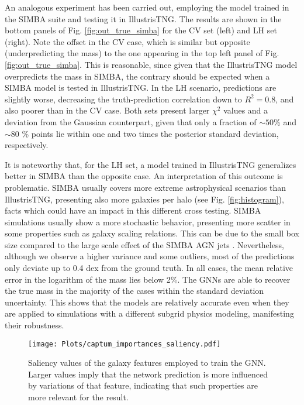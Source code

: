 \documentclass[twocolumn]{aastex631}
\begin{document}
An analogous experiment has been carried out, employing the model trained in the SIMBA suite and testing it in IllustrisTNG. The results are shown in the bottom panels of Fig. \ref{fig:out_true_simba} for the CV set (left) and LH set (right). Note the offset in the CV case, which is similar but opposite (underpredicting the mass) to the one appearing in the top left panel of Fig. \ref{fig:out_true_simba}. This is reasonable, since given that the IllustrisTNG model overpredicts the mass in SIMBA, the contrary should be expected when a SIMBA model is tested in IllustrisTNG. In the LH scenario, predictions are slightly worse, decreasing the truth-prediction correlation down to $R^2=0.8$, and also poorer than in the CV case. Both sets present larger $\chi^2$ values and a deviation from the Gaussian counterpart, given that only a fraction of $\sim 50$\% and $\sim 80$ \% points lie within one and two times the posterior standard deviation, respectively.

It is noteworthy that, for the LH set, a model trained in IllustrisTNG generalizes better in SIMBA than the opposite case. An interpretation of this outcome is problematic. SIMBA usually covers more extreme astrophysical scenarios than IllustrisTNG, presenting also more galaxies per halo (see Fig. \ref{fig:histogram}), facts which could have an impact in this different cross testing. SIMBA simulations usually show a more stochastic behavior, presenting more scatter in some properties such as galaxy scaling relations. This can be due to the small box size compared to the large scale effect of the SIMBA AGN jets \citep{Dave:2019yyq, villaescusanavarro2020camels}. Nevertheless, although we observe a higher variance and some outliers, most of the predictions only deviate up to 0.4 dex from the ground truth. In all cases, the mean relative error in the logarithm of the mass lies below 2\%. The GNNs are able to recover the true mass in the majority of the cases within the standard deviation uncertainty. This shows that the models are relatively accurate even when they are applied to simulations with a different subgrid physics modeling, manifesting their robustness.


\begin{figure}[t!]
\begin{center}
\texttt{[image: Plots/captum\_importances\_saliency.pdf]}
\caption{Saliency values of the galaxy features employed to train the GNN. Larger values imply that the network prediction
is more influenced by variations of that feature, indicating that such properties are more relevant for the result.}
\label{fig:captum}
\end{center}
\end{figure}
\end{document}
